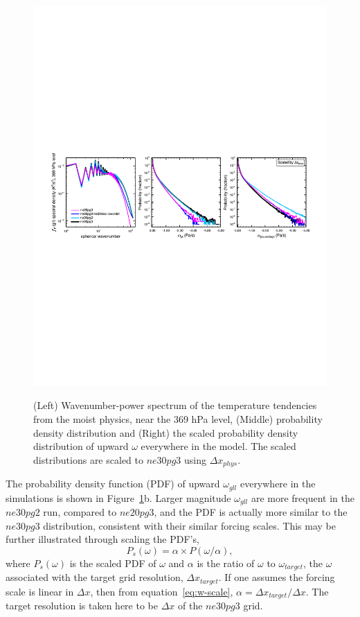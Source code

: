 \documentclass{agujournal}
\begin{document}
\begin{figure}[t]
\begin{center}
\noindent\includegraphics[width=30pc,angle=0]{figs/panel_ne20pg2-ne30pg2-ne30pg3.pdf}\\
\end{center}
\caption{(Left) Wavenumber-power spectrum of the temperature tendencies from the moist physics, near the 369 hPa level, (Middle) probability density distribution and (Right) the scaled probability density distribution of upward $\omega$ everywhere in the model. The scaled distributions are scaled to $ne30pg3$ using $\Delta x_{phys}$.}
\label{fig:pgXpanel-lores}
\end{figure}

The probability density function (PDF) of upward $\omega_{gll}$ everywhere in the simulations is shown in Figure~\ref{fig:pgXpanel-lores}b. Larger magnitude $\omega_{gll}$ are more frequent in the $ne30pg2$ run, compared to $ne20pg3$, and the PDF is actually more similar to the $ne30pg3$ distribution, consistent with their similar forcing scales. This may be further illustrated through scaling the PDF's,
\begin{equation}
P_{s}(\omega) = \alpha \times P(\omega/\alpha),\label{eq:pdf}
\end{equation}
where $P_{s}(\omega)$ is the scaled PDF of $\omega$ and $\alpha$ is the ratio of $\omega$ to $\omega_{target}$, the $\omega$ associated with the target grid resolution, $\Delta x_{target}$. If one assumes the forcing scale is linear in $\Delta x$, then from equation~\ref{eq:w-scale}, $\alpha = \Delta x_{target}/\Delta x$. The target resolution is taken here to be $\Delta x$ of the $ne30pg3$ grid. 
\end{document}
